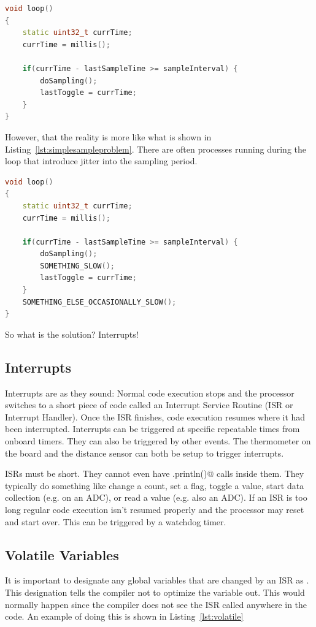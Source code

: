 \begin{lstlisting}[language=C++, caption={This listing shows a simplistic way to time sampling.},label={lst:wrongsampling}]
void loop()
{
    static uint32_t currTime;
    currTime = millis();

    if(currTime - lastSampleTime >= sampleInterval) {
        doSampling();
        lastToggle = currTime;
    }
}
\end{lstlisting}

However, that the reality is more like what is shown in Listing~\ref{lst:simplesampleproblem}.
There are often processes running during the loop that introduce jitter into the sampling period.

\begin{lstlisting}[language=C++, caption={The problem with the simplistic approach is slow processes that introduce jitter.},label={lst:simplesampleproblem}]
void loop()
{
    static uint32_t currTime;
    currTime = millis();
    
    if(currTime - lastSampleTime >= sampleInterval) {
        doSampling();
        SOMETHING_SLOW();
        lastToggle = currTime;
    }
    SOMETHING_ELSE_OCCASIONALLY_SLOW();
}
\end{lstlisting}

So what is the solution? Interrupts!

\subsection{Interrupts}
Interrupts are as they sound: Normal code execution stops and the processor switches to a 
short piece of code called an Interrupt Service Routine (ISR or Interrupt Handler). Once 
the ISR finishes, code execution resumes where it had been interrupted. Interrupts can be 
triggered at specific repeatable times from onboard timers. They can also be triggered by 
other events. The thermometer on the board and the distance sensor can both be setup to 
trigger interrupts. 

ISRs must be short. They cannot even have \lstinline@Serial.println()@ calls inside them.
They typically do something like change a count, set a flag, toggle a value, start data 
collection (e.g. on an ADC), or read a value (e.g. also an ADC). If an ISR is too long 
regular code execution isn't resumed properly and the processor may reset and start over.
This can be triggered by a watchdog timer. 

\subsection{Volatile Variables}
It is important to designate any global variables that are changed by an ISR as 
\lstinline@volatile@. This designation tells the compiler not to optimize the variable 
out. This would normally happen since the compiler does not see the ISR called anywhere 
in the code. An example of doing this is shown in Listing~\ref{lst:volatile}

